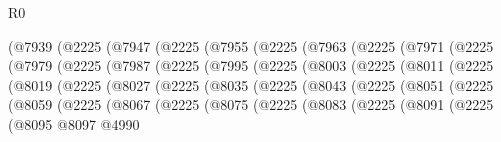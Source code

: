 \begin{lexlean}{R0}
\begin{coremodule}
            (@7939
              (@2225
                (@7947
                  (@2225
                    (@7955
                      (@2225
                        (@7963
                          (@2225
                            (@7971
                              (@2225
                                (@7979
                                  (@2225
                                    (@7987
                                      (@2225
                                        (@7995
                                          (@2225
                                            (@8003
                                              (@2225
                                                (@8011
                                                  (@2225
                                                    (@8019
                                                      (@2225
                                                        (@8027
                                                          (@2225
                                                            (@8035
                                                              (@2225
                                                                (@8043
                                                                  (@2225
                                                                    (@8051
                                                                      (@2225
                                                                        (@8059
                                                                          (@2225
                                                                            (@8067
                                                                              (@2225
                                                                                (@8075
                                                                                  (@2225
                                                                                    (@8083
                                                                                      (@2225
                                                                                        (@8091
                                                                                          (@2225
                                                                                            (@8095
                                                                                              @8097
                                                                                              @4990

\end{coremodule}
\end{lexlean}
